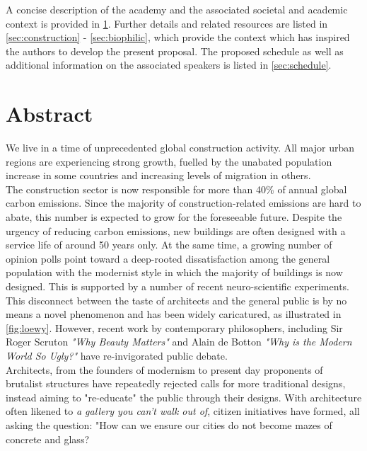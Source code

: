 \documentclass{article}
\begin{document}
A concise description of the academy and the associated societal and academic context is provided in \cref{sec:abstract}. Further details and related resources are listed in \cref{sec:construction} - \cref{sec:biophilic}, which provide the context which has inspired the authors to develop the present proposal. The proposed schedule as well as additional information on the associated speakers is listed in \cref{sec:schedule}.


\section{Abstract}
\label{sec:abstract}

\begin{minipage}{0.625\textwidth}

We live in a time of unprecedented global construction activity. All major urban regions are experiencing strong growth, fuelled by the unabated population increase in some countries and increasing levels of migration in others. \\

The construction sector is now responsible for more than 40\% of annual global carbon emissions. Since the majority of construction-related emissions are hard to abate, this number is expected to grow for the foreseeable future. Despite the urgency of reducing carbon emissions, new buildings are often designed with a service life of around 50 years only. At the same time, a growing number of opinion polls point toward a deep-rooted dissatisfaction among the general population with the modernist style in which the majority of buildings is now designed. This is supported by a number of recent neuro-scientific experiments. \\

This disconnect between the taste of architects and the general public is by no means a novel phenomenon and has been widely caricatured, as illustrated in \cref{fig:loewy}. However, recent work by contemporary philosophers, including Sir Roger Scruton \textit{"Why Beauty Matters"} and Alain de Botton \textit{"Why is the Modern World So Ugly?"} have re-invigorated public debate. \\

Architects, from the founders of modernism to present day proponents of brutalist structures have repeatedly rejected calls for more traditional designs, instead aiming to "re-educate" the public through their designs. With architecture often likened to \textit{a gallery you can't walk out of}, citizen initiatives have formed, all asking the question: "How can we ensure our cities do not become mazes of concrete and glass? \\


\end{minipage}
\end{document}
